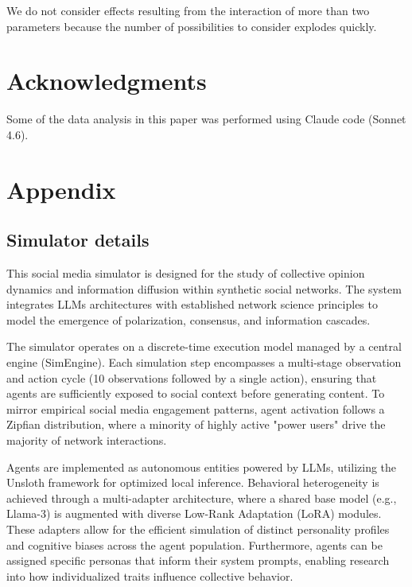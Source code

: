 \documentclass{article} %
\begin{document}
We do not consider effects resulting from the interaction of more than two parameters because the number of possibilities to consider explodes quickly.


\section*{Acknowledgments}

Some of the data analysis in this paper was performed using Claude code (Sonnet 4.6).




\appendix

\section{Appendix}

\subsection{Simulator details}
\label{appendix_simulator_details}

This social media simulator is designed for the study of collective opinion dynamics and information diffusion within synthetic social networks. The system integrates LLMs architectures with established network science principles to model the emergence of polarization, consensus, and information cascades.

The simulator operates on a discrete-time execution model managed by a central engine (SimEngine). Each simulation step encompasses a multi-stage observation and action cycle (10 observations followed by a single action), ensuring that agents are sufficiently exposed to social context before generating content. To mirror empirical social media engagement patterns, agent activation follows a Zipfian distribution, where a minority of highly active "power users" drive the majority of network interactions.

Agents are implemented as autonomous entities powered by LLMs, utilizing the Unsloth framework for optimized local inference. Behavioral heterogeneity is achieved through a multi-adapter architecture, where a shared base model (e.g., Llama-3) is augmented with diverse Low-Rank Adaptation (LoRA) modules. These adapters allow for the efficient simulation of distinct personality profiles and cognitive biases across the agent population. Furthermore, agents can be assigned specific personas that inform their system prompts, enabling research into how individualized traits influence collective behavior.
\end{document}

